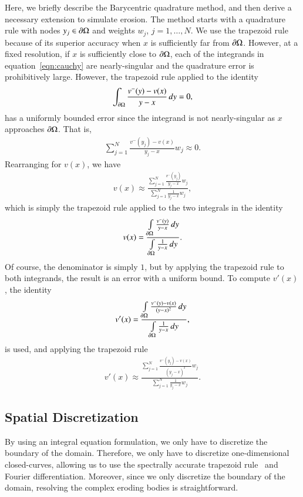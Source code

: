 \documentclass[preprint, 10pt]{elsarticle}
\begin{document}
Here, we briefly describe the Barycentric quadrature method, and then
derive a necessary extension to simulate erosion.  The method starts
with a quadrature rule with nodes $y_j \in {\partial}\Omega$ and weights $w_j$,
$j=1,\ldots,N$.  We use the trapezoid rule because of its superior
accuracy when $x$ is sufficiently far from ${\partial}\Omega$.  However, at a
fixed resolution, if $x$ is sufficiently close to ${\partial}\Omega$, each of
the integrands in equation~\eqref{eqn:cauchy} are nearly-singular and
the quadrature error is prohibitively large.  However, the trapezoid
rule applied to the identity
\begin{align}
  \int_{{\partial}\Omega} \frac{v^{-}(y) - v(x)}{y - x} \,dy = 0,
\end{align}
has a uniformly bounded error since the integrand is not nearly-singular
as $x$ approaches ${\partial}\Omega$.  That is,
\begin{align}
  \sum_{j=1}^{N} \frac{v^{-}(y_j) - v(x)}{y_j - x} w_j \approx 0.
\end{align}
Rearranging for $v(x)$, we have
\begin{align*}
  v(x) \approx \frac{\sum\limits_{j=1}^N \frac{v^{-}(y_j)}{y_j - x} w_j}
  {\sum\limits_{j=1}^N \frac{1}{y_j - x} w_j},
\end{align*}
which is simply the trapezoid rule applied to the two integrals in the
identity
\begin{align}
  v(x) = \frac{\int\limits_{{\partial}\Omega} \frac{v^{-}(y)}{y-x}\, dy}
    {\int\limits_{{\partial}\Omega} \frac{1}{y-x}\, dy}.
\end{align}
Of course, the denominator is simply $1$, but by applying the trapezoid
rule to both integrands, the result is an error with a uniform bound.
To compute $v'(x)$, the identity
\begin{align}
  v'(x) = \frac{\int\limits_{{\partial}\Omega} 
    \frac{v^{-}(y) - v(x)}{(y-x)^2}\, dy}
  {\int\limits_{{\partial}\Omega} \frac{1}{y-x}\, dy},
\end{align}
is used, and applying the trapezoid rule
\begin{align}
  v'(x) \approx \frac{\sum\limits_{j=1}^{N}
    \frac{v^{-}(y_j) - v(x)}{(y_j-x)^2} w_j}
  {\sum\limits_{j=1}^{N} \frac{1}{y_j-x} w_j}.
\end{align}

\subsection{Spatial Discretization}
\label{s:spatialDiscretization}
By using an integral equation formulation, we only have to discretize
the boundary of the domain.  Therefore, we only have to discretize
one-dimensional closed-curves, allowing us to use the spectrally
accurate trapezoid rule~\cite{tre-wei2014} and Fourier differentiation.
Moreover, since we only discretize the boundary of the domain, resolving
the complex eroding bodies is straightforward.
\end{document}
